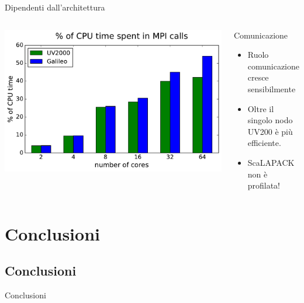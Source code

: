 \documentclass[8pt]{beamer}
\begin{document}
\begin{frame}{Dipendenti dall'architettura}
\begin{columns}
		\begin{center}			
			\vspace{-1cm}
			\includegraphics[width=1\textwidth]{arch_mpi_perc.pdf}			
		\end{center}
		\begin{overlayarea}{\linewidth}{\textheight}
		\begin{block}{Comunicazione}
			\begin{itemize}
				\item<1-> Ruolo comunicazione cresce sensibilmente
				\item<2-> Oltre il singolo nodo UV200 \`e pi\`u efficiente.
				\item<3-> ScaLAPACK non \`e profilata!
			\end{itemize}		
		\end{block}

		\end{overlayarea}
\end{columns}

\end{frame}




\section{Conclusioni}
\subsection{Conclusioni}

\begin{frame}{Conclusioni}


\end{frame}
\end{document}
